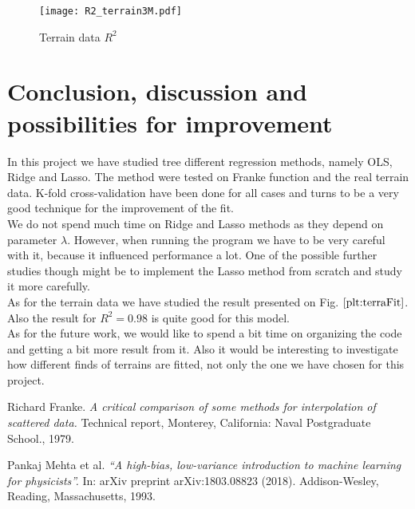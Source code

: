 \documentclass[10pt]{article}
\begin{document}
\begin{figure}
	\centerline{\texttt{[image: R2\_terrain3M.pdf]}}
	\caption{Terrain data $R^2$} \label{plt:R2Terra}
\end{figure}







\newpage
\section{Conclusion, discussion and possibilities for improvement}\label{Conclusion}
In this project we have studied tree different regression methods, namely OLS, Ridge and Lasso. The method were tested on Franke function and the real terrain data. K-fold cross-validation have been done for all cases and turns to be a very good technique for the improvement of the fit. \\
We do not spend much time on Ridge and Lasso methods as they depend on parameter $\lambda$. However, when running the program we have to be very careful with it, because it influenced performance a lot. One of the possible further studies though might be to implement the Lasso method from scratch and study it more carefully.\\
As for the terrain data we have studied the result presented on Fig. $\ref{plt:terraFit}$. Also the result for $R^2= 0.98$ is quite good for this model.\\
As for the future work, we would like to spend a bit time on organizing the code and getting a bit more result from it. Also it would be interesting to investigate how different finds of terrains are fitted, not only the one we have chosen for this project.\\


\newpage
\begin{thebibliography}{9}
	Richard Franke. 
	\textit{A critical comparison of some methods for interpolation of scattered data. }
	Technical report, Monterey, California: Naval Postgraduate School., 1979.
	
	Pankaj Mehta et al. 
	\textit{ “A high-bias, low-variance introduction to machine learning for physicists”.}
	 In: arXiv preprint arXiv:1803.08823 (2018). Addison-Wesley, Reading, Massachusetts, 1993.


\end{thebibliography}
\end{document}
